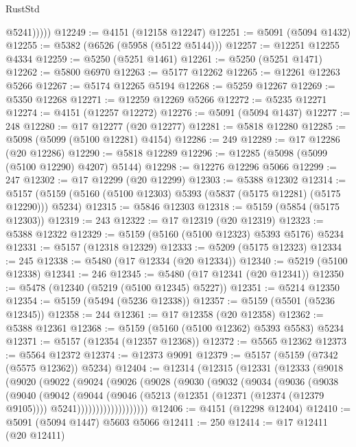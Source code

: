 \begin{lexlean}{RustStd}
\begin{coremodule}
              @5241)))))
@12249 := @4151 (@12158 @12247)
@12251 := @5091 (@5094 @1432)
@12255 := @5382 (@6526 (@5958 (@5122 @5144)))
@12257 := @12251 @12255 @4334
@12259 := @5250 (@5251 @1461)
@12261 := @5250 (@5251 @1471)
@12262 := @5800 @6970
@12263 := @5177 @12262
@12265 := @12261 @12263 @5266
@12267 := @5174 @12265 @5194
@12268 := @5259 @12267
@12269 := @5350 @12268
@12271 := @12259 @12269 @5266
@12272 := @5235 @12271
@12274 := @4151 (@12257 @12272)
@12276 := @5091 (@5094 @1437)
@12277 := 248
@12280 := @17 @12277 (@20 @12277)
@12281 := @5818 @12280
@12285 := @5098 (@5099 (@5100 @12281) @4154)
@12286 := 249
@12289 := @17 @12286 (@20 @12286)
@12290 := @5818 @12289
@12296 := @12285 (@5098 (@5099 (@5100 @12290) @4207) @5144)
@12298 := @12276 @12296 @5066
@12299 := 247
@12302 := @17 @12299 (@20 @12299)
@12303 := @5388 @12302
@12314 := @5157 (@5159 (@5160 (@5100 @12303) @5393 (@5837 (@5175 @12281) (@5175 @12290))) @5234)
@12315 := @5846 @12303
@12318 := @5159 (@5854 (@5175 @12303))
@12319 := 243
@12322 := @17 @12319 (@20 @12319)
@12323 := @5388 @12322
@12329 := @5159 (@5160 (@5100 @12323) @5393 @5176) @5234
@12331 := @5157 (@12318 @12329)
@12333 := @5209 (@5175 @12323)
@12334 := 245
@12338 := @5480 (@17 @12334 (@20 @12334))
@12340 := @5219 (@5100 @12338)
@12341 := 246
@12345 := @5480 (@17 @12341 (@20 @12341))
@12350 := @5478 (@12340 (@5219 (@5100 @12345) @5227))
@12351 := @5214 @12350
@12354 := @5159 (@5494 (@5236 @12338))
@12357 := @5159 (@5501 (@5236 @12345))
@12358 := 244
@12361 := @17 @12358 (@20 @12358)
@12362 := @5388 @12361
@12368 := @5159 (@5160 (@5100 @12362) @5393 @5583) @5234
@12371 := @5157 (@12354 (@12357 @12368))
@12372 := @5565 @12362
@12373 := @5564 @12372
@12374 := @12373 @9091
@12379 := @5157 (@5159 (@7342 (@5575 @12362)) @5234)
@12404 := @12314
    (@12315
      (@12331
        (@12333
          (@9018
            (@9020
              (@9022
                (@9024
                  (@9026
                    (@9028
                      (@9030
                        (@9032
                          (@9034
                            (@9036
                              (@9038
                                (@9040
                                  (@9042
                                    (@9044
                                      (@9046
                                        (@5213
                                          (@12351 (@12371 (@12374 (@12379 @9105))))
                                          @5241)))))))))))))))))))
@12406 := @4151 (@12298 @12404)
@12410 := @5091 (@5094 @1447) @5603 @5066
@12411 := 250
@12414 := @17 @12411 (@20 @12411)

\end{coremodule}
\end{lexlean}
